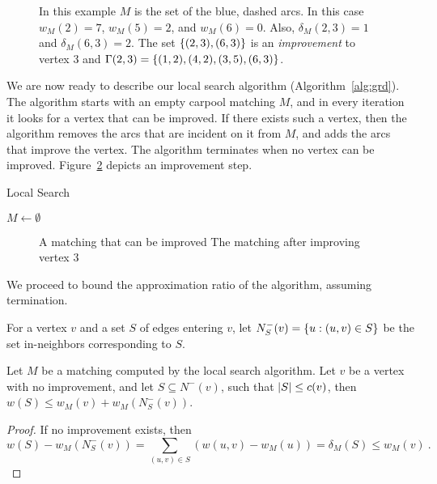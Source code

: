 \begin{figure}
\centering

\caption{In this example $M$ is the set of the blue, dashed arcs.
In this case $w_M(2) = 7$, $w_M(5) = 2$, and $w_M(6) = 0$.  Also,
$\delta_M(2, 3) = 1$ and $\delta_M(6, 3) = 2$.  The set $\left\{ (2,3),
(6,3) \right\}$ is an \emph{improvement} to vertex 3 and $\Gamma(2,3)
= \left\{ (1,2),(4,2),(3,5),(6,3) \right\}$.}
\label{fig:defs}
\end{figure}

We are now ready to describe our local search algorithm
(Algorithm~\ref{alg:grd}).  The algorithm starts with an empty
carpool matching $M$, and in every iteration it looks for a vertex
that can be improved.  If there exists such a vertex, then the
algorithm removes the arcs that are incident on it from $M$, and adds
the arcs that improve the vertex.  The algorithm terminates when no
vertex can be improved.  Figure~\ref{fig:improvement} depicts an
improvement step.

\begin{algorithm}
\caption{
\label{alg:grd}
Local Search
}
$M \gets \emptyset$ \\
\end{algorithm}

\begin{figure}
\centering

\caption[]{
\label{fig:improvement}
A matching that can be improved
The matching after improving vertex 3
}
\end{figure}

We proceed to bound the approximation ratio of the algorithm, assuming
termination.

For a vertex $v$ and a set $S$ of edges entering $v$, let $N^-_S(v)
= \left\{ u : (u,v) \in S \right\}$ be the set in-neighbors corresponding to $S$.

\begin{lemma}
\label{lm:no improve}
Let $M$ be a matching computed by the local search algorithm.  Let $v$
be a vertex with no improvement, and let $S \subseteq N^-(v)$, such
that $\left| S \right| \leq c(v)$, then $w(S) \leq w_M(v) + w_M(N^-_S(v))$.
\end{lemma}
\begin{proof}
If no improvement exists, then
\[
w(S) - w_M(N^-_S(v))
=    \sum_{(u,v) \in S} (w(u,v) - w_M(u))
=    \delta_M(S) 
\leq w_M(v)
~.
\]
\end{proof}


